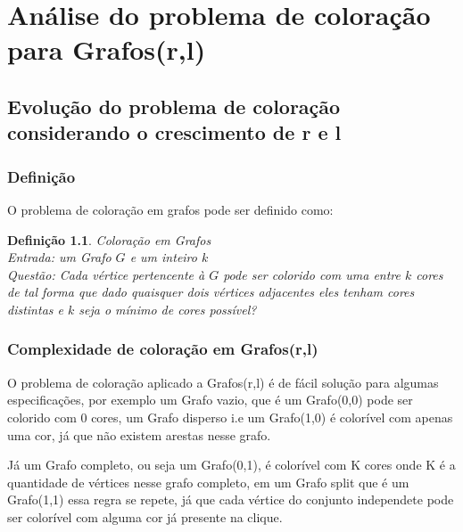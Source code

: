 \documentclass[
	12pt,				%
	openright,			%
	oneside,			%
	a4paper,			%
	english,			%
	french,				%
	spanish,			%
	brazil				%
	]{abntex2}
\newtheorem{definition}{Definição}
\begin{document}


\part{Análise do problema de coloração para Grafos(r,l)}

\chapter{Evolução do problema de coloração considerando o crescimento de r e l}

\section{Definição}

O problema de coloração em grafos pode ser definido como:

\begin{definition}
  Coloração em Grafos\\
  Entrada: um Grafo $G$ e um inteiro $k$\\
  Questão: Cada vértice pertencente à $G$ pode ser colorido com uma entre $k$ cores
  de tal forma que dado quaisquer dois vértices adjacentes eles tenham cores distintas e $k$ seja o mínimo de cores possível? 
\end{definition}

\section{Complexidade de coloração em Grafos(r,l)}

O problema de coloração aplicado a Grafos(r,l) é de fácil solução para algumas especificações,
por exemplo um Grafo vazio, que é um Grafo(0,0) pode ser colorido com 0 cores, um Grafo disperso i.e um Grafo(1,0) é colorível com apenas uma cor, já que não existem arestas nesse grafo.

Já um Grafo completo, ou seja um Grafo(0,1), é colorível com K cores onde K é a quantidade de vértices nesse grafo completo, em um Grafo split que é um Grafo(1,1) essa regra se repete, já que cada vértice do conjunto independete pode ser colorível com alguma cor já presente na clique.
\end{document}
